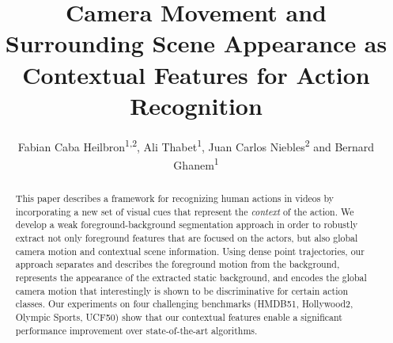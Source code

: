 \documentclass[runningheads]{llncs}
\begin{document}
\newcommand{\point}{
    \raise0.7ex\hbox{.}
    }


\pagestyle{headings}

\mainmatter

\title{Camera Movement and Surrounding Scene Appearance as Contextual Features for Action Recognition} %



\author{Fabian Caba Heilbron\textsuperscript{1,2}, Ali Thabet\textsuperscript{1}, Juan Carlos Niebles\textsuperscript{2} and Bernard Ghanem\textsuperscript{1}} %

\maketitle

\begin{abstract}
This paper describes a framework for recognizing human actions in videos by incorporating a new set of visual cues that represent the \emph{context} of the action. We develop a weak foreground-background segmentation approach in order to robustly extract not only foreground features that are focused on the actors, but also global camera motion and contextual scene information. Using dense point trajectories, our approach separates and describes the foreground motion from the background, represents the appearance of the extracted static background, and encodes the global camera motion that interestingly is shown to be discriminative for certain action classes. Our experiments on four challenging benchmarks (HMDB51, Hollywood2, Olympic Sports, UCF50) show that our contextual features enable a significant performance improvement over state-of-the-art algorithms.
\end{abstract}
\end{document}

